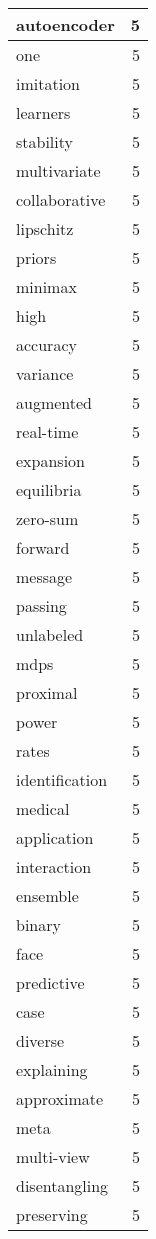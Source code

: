 \begin{table}[h]
\begin{tabular}{|l|r|}
\hline
autoencoder & 5 \\
\hline
one & 5 \\
\hline
imitation & 5 \\
\hline
learners & 5 \\
\hline
stability & 5 \\
\hline
multivariate & 5 \\
\hline
collaborative & 5 \\
\hline
lipschitz & 5 \\
\hline
priors & 5 \\
\hline
minimax & 5 \\
\hline
high & 5 \\
\hline
accuracy & 5 \\
\hline
variance & 5 \\
\hline
augmented & 5 \\
\hline
real-time & 5 \\
\hline
expansion & 5 \\
\hline
equilibria & 5 \\
\hline
zero-sum & 5 \\
\hline
forward & 5 \\
\hline
message & 5 \\
\hline
passing & 5 \\
\hline
unlabeled & 5 \\
\hline
mdps & 5 \\
\hline
proximal & 5 \\
\hline
power & 5 \\
\hline
rates & 5 \\
\hline
identification & 5 \\
\hline
medical & 5 \\
\hline
application & 5 \\
\hline
interaction & 5 \\
\hline
ensemble & 5 \\
\hline
binary & 5 \\
\hline
face & 5 \\
\hline
predictive & 5 \\
\hline
case & 5 \\
\hline
diverse & 5 \\
\hline
explaining & 5 \\
\hline
approximate & 5 \\
\hline
meta & 5 \\
\hline
multi-view & 5 \\
\hline
disentangling & 5 \\
\hline
preserving & 5 \\

\end{tabular}
\end{table}
